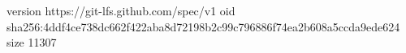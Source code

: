 version https://git-lfs.github.com/spec/v1
oid sha256:4ddf4ce738dc662f422aba8d72198b2c99c796886f74ea2b608a5ccda9ede624
size 11307
